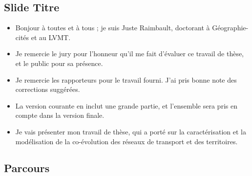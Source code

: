 \documentclass[12pt]{article}
\begin{document}
\subsection*{Slide Titre}

\begin{itemize}
	\item Bonjour à toutes et à tous ; je suis Juste Raimbault, doctorant à Géographie-cités et au LVMT.
	\item Je remercie le jury pour l'honneur qu'il me fait d'évaluer ce travail de thèse, et le public pour sa présence.
	\item Je remercie les rapporteurs pour le travail fourni. J'ai pris bonne note des corrections suggérées.
	\item La version courante en inclut une grande partie, et l'ensemble sera pris en compte dans la version finale.
	\item Je vais présenter mon travail de thèse, qui a porté sur la caractérisation et la modélisation de la co-évolution des réseaux de transport et des territoires.
\end{itemize}


\newpage


\subsection*{Parcours}
\end{document}
